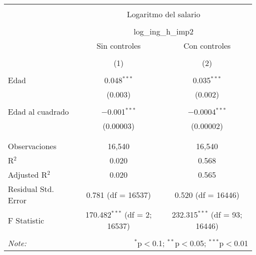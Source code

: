
\begin{table}[!htbp] \centering 
  \caption{} 
  \label{} 
\begin{tabular}{@{\extracolsep{5pt}}lcc} 
\\[-1.8ex]\hline 
\hline \\[-1.8ex] 
 & \multicolumn{2}{c}{Logaritmo del salario} \\ 
\cline{2-3} 
\\[-1.8ex] & \multicolumn{2}{c}{log\_ing\_h\_imp2} \\ 
 & Sin controles & Con controles \\ 
\\[-1.8ex] & (1) & (2)\\ 
\hline \\[-1.8ex] 
 Edad & 0.048$^{***}$ & 0.035$^{***}$ \\ 
  & (0.003) & (0.002) \\ 
  & & \\ 
 Edad al cuadrado & $-$0.001$^{***}$ & $-$0.0004$^{***}$ \\ 
  & (0.00003) & (0.00002) \\ 
  & & \\ 
\hline \\[-1.8ex] 
Observaciones & 16,540 & 16,540 \\ 
R$^{2}$ & 0.020 & 0.568 \\ 
Adjusted R$^{2}$ & 0.020 & 0.565 \\ 
Residual Std. Error & 0.781 (df = 16537) & 0.520 (df = 16446) \\ 
F Statistic & 170.482$^{***}$ (df = 2; 16537) & 232.315$^{***}$ (df = 93; 16446) \\ 
\hline 
\hline \\[-1.8ex] 
\textit{Note:}  & \multicolumn{2}{r}{$^{*}$p$<$0.1; $^{**}$p$<$0.05; $^{***}$p$<$0.01} \\ 
\end{tabular} 
\end{table} 
